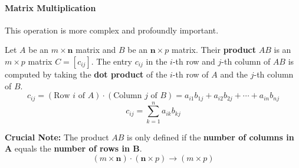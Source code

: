 \newpage

\paragraph{Matrix Multiplication}
This operation is more complex and profoundly important.

\begin{definition}
Let $A$ be an $m \times \mathbf{n}$ matrix and $B$ be an $\mathbf{n} \times p$ matrix. Their \textbf{product} $AB$ is an $m \times p$ matrix $C = [c_{ij}]$.
The entry $c_{ij}$ in the $i$-th row and $j$-th column of $AB$ is computed by taking the \textbf{dot product} of the $i$-th row of $A$ and the $j$-th column of $B$.
\[ c_{ij} = (\text{Row } i \text{ of } A) \cdot (\text{Column } j \text{ of } B) = a_{i1}b_{1j} + a_{i2}b_{2j} + \cdots + a_{in}b_{nj} \]
\[ c_{ij} = \sum_{k=1}^{n} a_{ik}b_{kj} \]
\end{definition}

\textbf{Crucial Note:} The product $AB$ is only defined if the \textbf{number of columns in A} equals the \textbf{number of rows in B}.
\[
(m \times \mathbf{n}) \cdot (\mathbf{n} \times p) \to (m \times p)
\]


